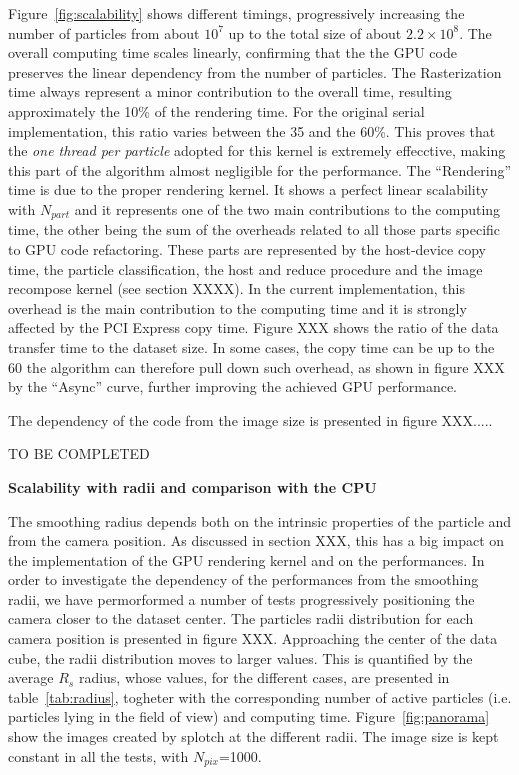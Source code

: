 \documentclass[11pt]{article}
\begin{document}
Figure~\ref{fig:scalability} shows different timings, progressively increasing the number of particles
from about $10^7$ up to the total size of about $2.2\times 10^8$. 
The overall computing time scales linearly, 
confirming that the the GPU code preserves the linear dependency from the 
number of particles. 
The Rasterization time always represent 
a minor contribution to the overall time, resulting approximately the 10\% of the rendering 
time. For the original serial implementation, this ratio varies between the 35 and the 60\%.
This proves that the {\it one thread per particle} adopted for this kernel
is extremely effecctive, making this part of the algorithm almost negligible
for the performance.
The ``Rendering'' time 
is due to the proper rendering kernel. It shows a perfect linear scalability
with $N_{part}$ and it represents one of the two main contributions
to the computing time, the other being the sum of the overheads related to all those 
parts specific to GPU code refactoring. These parts are represented by 
the host-device copy time, the particle classification, the host and reduce procedure 
and the image recompose kernel (see section XXXX). 
In the current implementation, this overhead is
the main contribution to the computing time and 
it is strongly affected by the PCI Express copy time. 
Figure XXX shows the ratio 
of the data transfer time to the dataset size. In some cases, the copy time can be 
up to the 60%
the algorithm can therefore pull down such overhead, as shown in figure XXX by
the ``Async'' curve, further improving the achieved GPU performance.  
 
The dependency of the code from the image size is presented in figure XXX..... 

TO BE COMPLETED 

\medskip
\noindent
{\bf Scalability with radii and comparison with the CPU}

The smoothing radius depends both on the intrinsic properties of the particle
and from the camera position. 
As discussed in section XXX, this has a big impact 
on the implementation of the GPU rendering kernel and
on the performances. In order to investigate the dependency of the performances from
the smoothing radii, we have permorformed a number of tests progressively 
positioning the camera closer to the dataset center. The particles radii distribution for each
camera position is presented in figure XXX. Approaching the center of the 
data cube, the radii distribution moves to larger values. This is quantified 
by the average $R_s$ radius, whose values, for the different cases, are presented in 
table~\ref{tab:radius}, togheter with the corresponding number of active particles 
(i.e. particles lying in the field of view) and computing time. 
Figure~\ref{fig:panorama} show the images created by splotch at the different radii.
The image size is kept constant in all the tests, with $N_{pix}$=1000.
\end{document}
